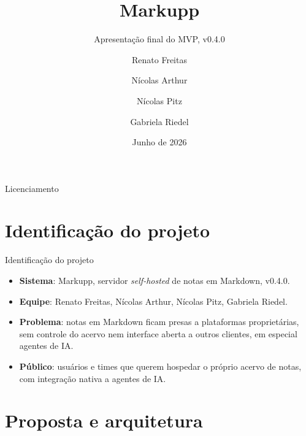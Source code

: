 \documentclass[aspectratio=169]{beamer}
\title{Markupp}
\subtitle{Apresentação final do MVP, v0.4.0}
\author{
  Renato Freitas \and Nícolas Arthur \and Nícolas Pitz \and Gabriela Riedel
}
\institute{Instituto Federal de Santa Catarina}
\date{Junho de 2026}
\begin{document}
\begin{frame}
    \maketitle
\end{frame}

\begin{frame}{Licenciamento}
    \licenciamentoLivre
\end{frame}

\section{Identificação do projeto}

\begin{frame}{Identificação do projeto}
    \begin{itemize}
        \item \textbf{Sistema}: Markupp, servidor \textit{self-hosted} de notas em Markdown, v0.4.0.
        \item \textbf{Equipe}: Renato Freitas, Nícolas Arthur, Nícolas Pitz, Gabriela Riedel.
        \item \textbf{Problema}: notas em Markdown ficam presas a plataformas proprietárias, sem controle do acervo nem interface aberta a outros clientes, em especial agentes de IA.
        \item \textbf{Público}: usuários e times que querem hospedar o próprio acervo de notas, com integração nativa a agentes de IA.
    \end{itemize}
\end{frame}

\section{Proposta e arquitetura}
\end{document}

